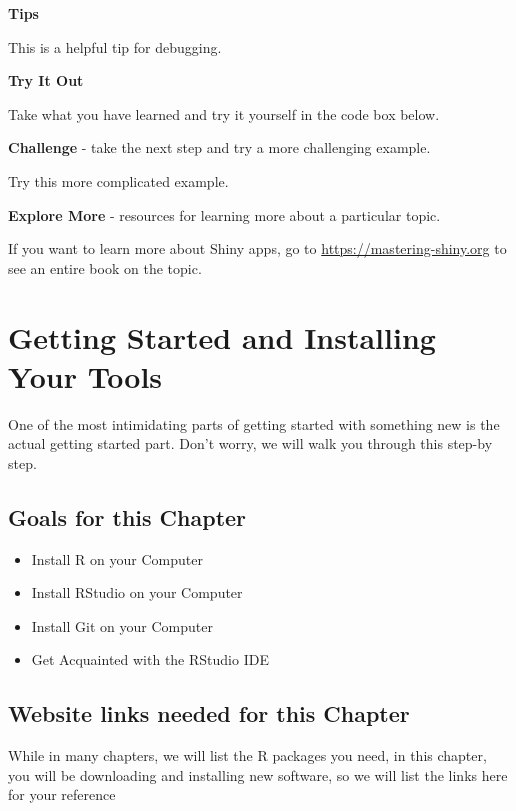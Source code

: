 \documentclass[
]{book}
\providecommand{\tightlist}{%
  \setlength{\itemsep}{0pt}\setlength{\parskip}{0pt}}
\begin{document}
\textbf{Tips}

This is a helpful tip for debugging.

\textbf{Try It Out}

Take what you have learned and try it yourself in the code box below.

\textbf{Challenge} - take the next step and try a more challenging example.

Try this more complicated example.

\textbf{Explore More} - resources for learning more about a particular topic.

If you want to learn more about Shiny apps, go to \url{https://mastering-shiny.org} to see an entire book on the topic.

\hypertarget{getting-started-and-installing-your-tools}{%
\chapter{Getting Started and Installing Your Tools}\label{getting-started-and-installing-your-tools}}

One of the most intimidating parts of getting started with something new is the actual getting started part. Don't worry, we will walk you through this step-by step.

\hypertarget{goals-for-this-chapter}{%
\section{Goals for this Chapter}\label{goals-for-this-chapter}}

\begin{itemize}
\tightlist
\item
  Install R on your Computer
\item
  Install RStudio on your Computer
\item
  Install Git on your Computer
\item
  Get Acquainted with the RStudio IDE
\end{itemize}

\hypertarget{website-links-needed-for-this-chapter}{%
\section{Website links needed for this Chapter}\label{website-links-needed-for-this-chapter}}

While in many chapters, we will list the R packages you need, in this chapter, you will be downloading and installing new software, so we will list the links here for your reference
\end{document}
